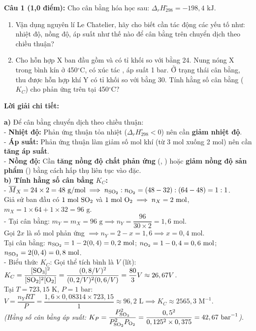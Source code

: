 \documentclass[10.5pt,a4paper]{article}
\newcommand{\loigiai}[1]{%
  \vspace{1pt}
  \begin{tcolorbox}
  {\color{myBlue}\bfseries Lời giải chi tiết:}\par\vspace{1pt}
  {\small #1}
  \end{tcolorbox}
  \vspace{2pt}
}
\begin{document}
\vspace{2pt}
\textbf{Câu 1 (1,0 điểm):} Cho cân bằng hóa học sau:  \quad $\Delta_r H^\circ_{298} = -198,4\text{ kJ}$.
\begin{enumerate}[label=\alph*), itemsep=1.5pt, topsep=1pt, leftmargin=0.8cm]
    \item Vận dụng nguyên lí Le Chatelier, hãy cho biết cần tác động các yếu tố như: nhiệt độ, nồng độ, áp suất như thế nào để cân bằng trên chuyển dịch theo chiều thuận?
    \item Cho hỗn hợp X ban đầu gồm  và  có tỉ khối so với  bằng 24. Nung nóng X trong bình kín ở 450$^\circ$C, có xúc tác , áp suất 1 bar. Ở trạng thái cân bằng, thu được hỗn hợp khí Y có tỉ khối so với  bằng 30. Tính hằng số cân bằng ($K_C$) cho phản ứng trên tại 450$^\circ$C?
\end{enumerate}
\loigiai{
\textbf{a)} Để cân bằng chuyển dịch theo chiều thuận:\\
- \textbf{Nhiệt độ:} Phản ứng thuận tỏa nhiệt ($\Delta_r H^\circ_{298} < 0$) nên cần \textbf{giảm nhiệt độ}.\\
- \textbf{Áp suất:} Phản ứng thuận làm giảm số mol khí (từ 3 mol xuống 2 mol) nên cần \textbf{tăng áp suất}.\\
- \textbf{Nồng độ:} Cần \textbf{tăng nồng độ chất phản ứng} (\ce{SO2}, \ce{O2}) hoặc \textbf{giảm nồng độ sản phẩm} (\ce{SO3}) bằng cách hấp thụ liên tục vào \ce{H2SO4} đặc.\\
\textbf{b) Tính hằng số cân bằng $K_C$:}\\
- $\overline{M}_X = 24 \times 2 = 48\text{ g/mol} \implies n_{\ce{SO2}} : n_{\ce{O2}} = (48 - 32) : (64 - 48) = 1 : 1$.\\
Giả sử ban đầu có $1\text{ mol \ce{SO2}}$ và $1\text{ mol \ce{O2}} \implies n_X = 2\text{ mol}$, $m_X = 1 \times 64 + 1 \times 32 = 96\text{ g}$.\\
- Tại cân bằng: $m_Y = m_X = 96\text{ g} \implies n_Y = \dfrac{96}{30 \times 2} = 1,6\text{ mol}$.\\
Gọi $2x$ là số mol \ce{SO2} phản ứng $\implies n_Y = 2 - x = 1,6 \implies x = 0,4\text{ mol}$.\\
Tại cân bằng: $n_{\ce{SO2}} = 1 - 2(0,4) = 0,2\text{ mol}$; $n_{\ce{O2}} = 1 - 0,4 = 0,6\text{ mol}$; $n_{\ce{SO3}} = 2(0,4) = 0,8\text{ mol}$.\\
- Biểu thức $K_C$: Gọi thể tích bình là $V$ (lít):\\
$K_C = \dfrac{[\ce{SO3}]^2}{[\ce{SO2}]^2 [\ce{O2}]} = \dfrac{(0,8/V)^2}{(0,2/V)^2 (0,6/V)} = \dfrac{80}{3}V \approx 26,67 V$.\\
Tại $T = 723,15\text{ K}$, $P = 1\text{ bar}$: $V = \dfrac{n_Y R T}{P} = \dfrac{1,6 \times 0,08314 \times 723,15}{1} \approx 96,2\text{ L} \implies K_C \approx 2565,3\text{ M}^{-1}$.\\
\textit{(Hằng số cân bằng áp suất: $K_P = \dfrac{P_{\ce{SO3}}^2}{P_{\ce{SO2}}^2 P_{\ce{O2}}} = \dfrac{0,5^2}{0,125^2 \times 0,375} = 42,67\text{ bar}^{-1}$)}.
}
\end{document}
